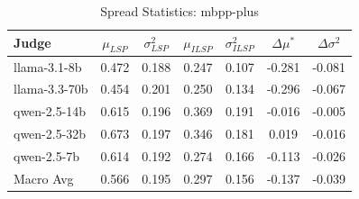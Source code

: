 \begin{table}[h]
\centering
\caption{Spread Statistics: mbpp-plus}
\label{tab:spread_mbpp-plus}
\begin{tabular}{l c c c c c c}
\hline
Judge & $\mu_{LSP}$ & $\sigma^2_{LSP}$ & $\mu_{ILSP}$ & $\sigma^2_{ILSP}$ & $\Delta\mu^*$ & $\Delta\sigma^2$ \\
\hline
llama-3.1-8b & 0.472 & 0.188 & 0.247 & 0.107 & -0.281 & -0.081 \\
llama-3.3-70b & 0.454 & 0.201 & 0.250 & 0.134 & -0.296 & -0.067 \\
qwen-2.5-14b & 0.615 & 0.196 & 0.369 & 0.191 & -0.016 & -0.005 \\
qwen-2.5-32b & 0.673 & 0.197 & 0.346 & 0.181 & 0.019 & -0.016 \\
qwen-2.5-7b & 0.614 & 0.192 & 0.274 & 0.166 & -0.113 & -0.026 \\
\hline
Macro Avg & 0.566 & 0.195 & 0.297 & 0.156 & -0.137 & -0.039 \\
\hline
\end{tabular}
\end{table}